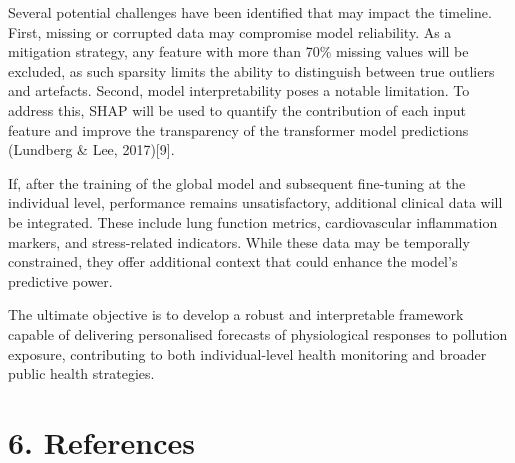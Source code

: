\documentclass[
]{article}
\begin{document}
Several potential challenges have been identified that may impact the
timeline. First, missing or corrupted data may compromise model
reliability. As a mitigation strategy, any feature with more than 70\%
missing values will be excluded, as such sparsity limits the ability to
distinguish between true outliers and artefacts. Second, model
interpretability poses a notable limitation. To address this, SHAP will
be used to quantify the contribution of each input feature and improve
the transparency of the transformer model predictions (Lundberg \& Lee,
2017){[}9{]}.

If, after the training of the global model and subsequent fine-tuning at
the individual level, performance remains unsatisfactory, additional
clinical data will be integrated. These include lung function metrics,
cardiovascular inflammation markers, and stress-related indicators.
While these data may be temporally constrained, they offer additional
context that could enhance the model's predictive power.

The ultimate objective is to develop a robust and interpretable
framework capable of delivering personalised forecasts of physiological
responses to pollution exposure, contributing to both individual-level
health monitoring and broader public health strategies.

\hypertarget{references}{%
\section{6. References}\label{references}}
\end{document}
